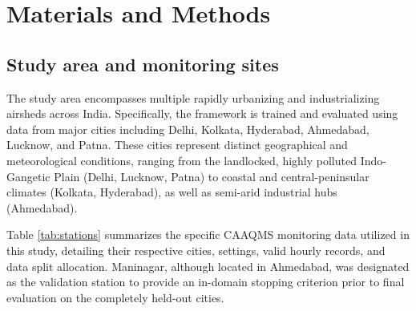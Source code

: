 \section{Materials and Methods}

\subsection{Study area and monitoring sites}
The study area encompasses multiple rapidly urbanizing and industrializing airsheds across India. Specifically, the framework is trained and evaluated using data from major cities including Delhi, Kolkata, Hyderabad, Ahmedabad, Lucknow, and Patna. These cities represent distinct geographical and meteorological conditions, ranging from the landlocked, highly polluted Indo-Gangetic Plain (Delhi, Lucknow, Patna) to coastal and central-peninsular climates (Kolkata, Hyderabad), as well as semi-arid industrial hubs (Ahmedabad). 

Table \ref{tab:stations} summarizes the specific CAAQMS monitoring data utilized in this study, detailing their respective cities, settings, valid hourly records, and data split allocation. Maninagar, although located in Ahmedabad, was designated as the validation station to provide an in-domain stopping criterion prior to final evaluation on the completely held-out cities.

\begin{table}[h]
\centering
\caption{Summary of continuous ambient air quality monitoring stations (CAAQMS) utilized in this study, including setting and data split allocation.}
\label{tab:stations}
\end{table}


